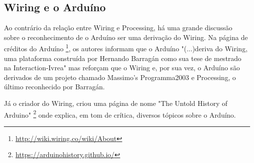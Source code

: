 \subsection{Wiring e o Arduíno}

Ao contrário da relação entre Wiring e Processing, há uma grande discussão sobre o reconhecimento de o Arduíno ser uma derivação do Wiring.
Na página de créditos do Arduíno \footnote{\url{http://wiki.wiring.co/wiki/About}}, os autores informam que o Arduíno "(...)deriva do Wiring, uma plataforma construída por Hernando Barragán como sua tese de mestrado na Interaction-Ivrea" mas reforçam que o Wiring e, por sua vez, o Arduíno são derivados de um projeto chamado Massimo's Programma2003 e Processing, o último reconhecido por Barragán. 

Já o criador do Wiring, criou uma página de nome "The Untold History of Arduino" \footnote{\url{https://arduinohistory.github.io/}} onde explica, em tom de crítica, diversos tópicos sobre o Arduíno.

